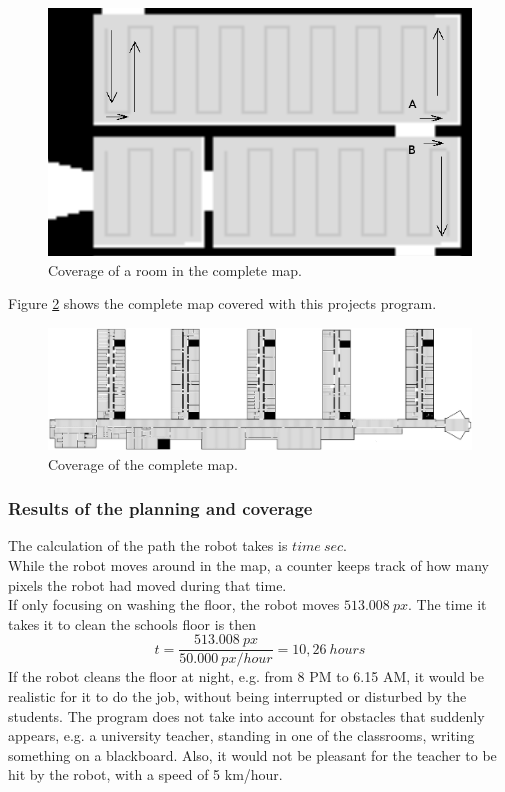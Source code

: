 \begin{figure}[H]
\centering
\includegraphics[scale=0.33]{img/room.png}
\caption{Coverage of a room in the complete map.}
\label{fig::room}
\end{figure}

Figure \ref{fig::coverage} shows the complete map covered with this projects program.

\begin{figure}[H]
\centering
\includegraphics[scale=0.33]{img/coverage.png}
\caption{Coverage of the complete map.}
\label{fig::coverage}
\end{figure}

\subsubsection{Results of the planning and coverage}
The calculation of the path the robot takes is $time\:sec$.\\[0.2cm]
While the robot moves around in the map, a counter keeps track of how many pixels the robot had moved during that time. \\[0.2cm]
If only focusing on washing the floor, the robot moves $513.008\:px$. The time it takes it to clean the schools floor is then
$$t=\frac{513.008\:px}{50.000\:px/hour}=10,26\:hours$$
If the robot cleans the floor at night, e.g. from 8 PM to 6.15 AM, it would be realistic for it to do the job, without being interrupted or disturbed by the students. The program does not take into account for obstacles that suddenly appears, e.g. a university teacher, standing in one of the classrooms, writing something on a blackboard. Also, it would not be pleasant for the teacher to be hit by the robot, with a speed of 5 km/hour.\\[0.2cm]

